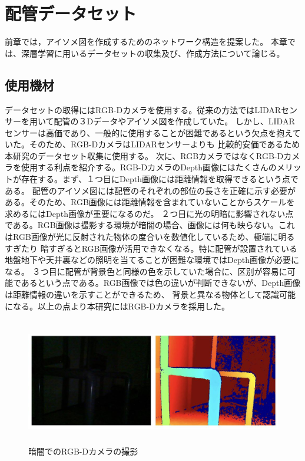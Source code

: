 \chapter{%
配管データセット}

前章では，アイソメ図を作成するためのネットワーク構造を提案した。
本章では、深層学習に用いるデータセットの収集及び、作成方法について論じる。


\section{使用機材}
データセットの取得にはRGB-Dカメラを使用する。従来の方法ではLIDARセンサーを用いて配管の３Dデータやアイソメ図を作成していた。
しかし、LIDARセンサーは高価であり、一般的に使用することが困難であるという欠点を抱えていた。そのため、RGB-DカメラはLIDARセンサーよりも
比較的安価であるため本研究のデータセット収集に使用する。
次に、RGBカメラではなくRGB-Dカメラを使用する利点を紹介する。RGB-DカメラのDepth画像にはたくさんのメリットが存在する。まず、１つ目にDepth画像には距離情報を取得できるという点である。
配管のアイソメ図には配管のそれぞれの部位の長さを正確に示す必要がある。そのため、RGB画像には距離情報を含まれていないことからスケールを求めるにはDepth画像が重要になるのだ。
２つ目に光の明暗に影響されない点である。RGB画像は撮影する環境が暗闇の場合、画像には何も映らない。これはRGB画像が光に反射された物体の度合いを数値化しているため、極端に明るすぎたり
暗すぎるとRGB画像が活用できなくなる。特に配管が設置されている地盤地下や天井裏などの照明を当てることが困難な環境ではDepth画像が必要になる。
３つ目に配管が背景色と同様の色を示していた場合に、区別が容易に可能であるという点である。RGB画像では色の違いが判断できないが、Depth画像は距離情報の違いを示すことができるため、
背景と異なる物体として認識可能になる。以上の点より本研究にはRGB-Dカメラを採用した。
\begin{figure}[htbt]
    \centering
     \includegraphics[height=55mm]{pipe_rgbd.eps}
     \caption{暗闇でのRGB-Dカメラの撮影}
     \label{fig:f2}
\end{figure}

